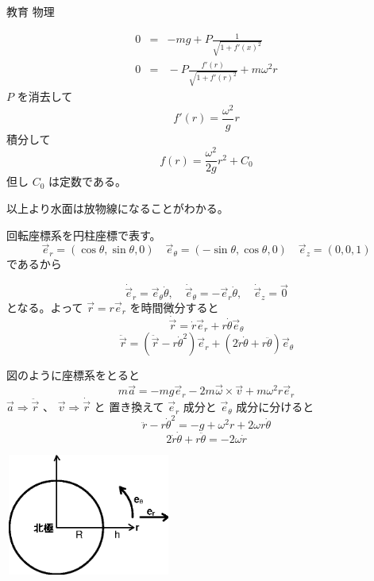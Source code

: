 \documentclass[fleqn]{jbook}
\begin{document}
\begin{answer}{教育 物理}{}
\begin{subanswers}
\begin{subsubanswers}
\begin{eqnarray}
0 & = & -mg + P \frac{1}{\sqrt{1+{f'\left(x\right)}^2}} \\
0 &=& {} - P \frac{f'\left(r\right)}
{\sqrt{1+{f'\left(r\right)}^2}} + m \omega^{2} r 
\end{eqnarray} 
 $P$ を消去して 
\[ f'\left(r\right) = \frac{{\omega}^2}{g}r \]
積分して 
\[ f\left(r\right) = \frac{{\omega}^2}{2g}r^{2} + C_{0} \]
但し $C_{0} $ は定数である。

以上より水面は放物線になることがわかる。

\SubSubAnswer
回転座標系を円柱座標で表す。
\[
\vec{e} _{r} = \left(\cos \theta , \sin \theta ,0 \right) \quad 
\vec{e} _{\theta} = \left( - \sin \theta , \cos \theta , 0 \right) \quad
\vec{e} _{z} =  \left( 0,0,1\right) 
\]
であるから

\parbox[t]{100mm}{
\[ \dot{\vec{e}}_{r} = \vec{e}_{\theta} \dot{\theta} ,\quad
\dot{\vec{e}}_{\theta} = - \vec{e}_{r} \dot{\theta} ,\quad  \dot{\vec{e}}_{z} =\vec{0} \]
となる。よって $\vec{r} = r\vec{e}_r $ を時間微分すると
\[\dot{\vec{r}} = \dot{r} \vec{e}_{r} + r\dot{\theta}\vec{e}_{\theta}\]
\[\ddot{\vec{r}}= \left(\ddot{\vec{r}}- r\dot{\theta}^2 \right)\vec{e}_{r} + \left(2\dot{r}\dot{\theta} + r \ddot{\theta} \right) \vec{e}_{\theta}
\]

図のように座標系をとると
\[ m \vec{a} = -mg \vec{e}_{r} - 2m \vec{\omega}\times\vec{v} + m{\omega}^{2}r\vec{e}_r \]
$ \vec{a} \Rightarrow \ddot{\vec{r}}$ 、 $\vec{v} \Rightarrow \dot{\vec{r}}$ と
置き換えて $\vec{e}_r$ 成分と $\vec{e}_{\theta} $ 成分に分けると
\[ \ddot{r} - r\dot{\theta}^2 = -g + \omega^{2} r + 2\omega r \dot{\theta} \]
\[ 2\dot{r}\dot{\theta} + r \ddot{\theta} = -2\omega \dot{r} \]
}\parbox[t]{60mm}{
\begin{center}
\includegraphics[clip,height=40mm,width=55mm]{1992phys-3-1.eps}
\end{center}
}


\end{subsubanswers}
\end{subanswers}
\end{answer}
\end{document}
